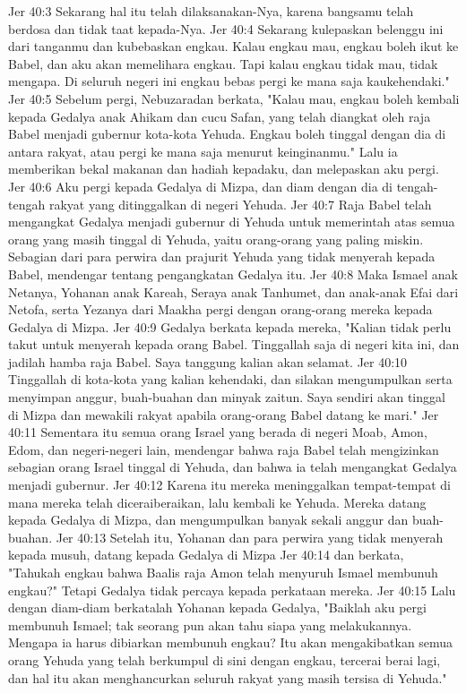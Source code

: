 Jer 40:3  Sekarang hal itu telah dilaksanakan-Nya, karena bangsamu telah berdosa dan tidak taat kepada-Nya.
Jer 40:4  Sekarang kulepaskan belenggu ini dari tanganmu dan kubebaskan engkau. Kalau engkau mau, engkau boleh ikut ke Babel, dan aku akan memelihara engkau. Tapi kalau engkau tidak mau, tidak mengapa. Di seluruh negeri ini engkau bebas pergi ke mana saja kaukehendaki."
Jer 40:5  Sebelum pergi, Nebuzaradan berkata, "Kalau mau, engkau boleh kembali kepada Gedalya anak Ahikam dan cucu Safan, yang telah diangkat oleh raja Babel menjadi gubernur kota-kota Yehuda. Engkau boleh tinggal dengan dia di antara rakyat, atau pergi ke mana saja menurut keinginanmu." Lalu ia memberikan bekal makanan dan hadiah kepadaku, dan melepaskan aku pergi.
Jer 40:6  Aku pergi kepada Gedalya di Mizpa, dan diam dengan dia di tengah-tengah rakyat yang ditinggalkan di negeri Yehuda.
Jer 40:7  Raja Babel telah mengangkat Gedalya menjadi gubernur di Yehuda untuk memerintah atas semua orang yang masih tinggal di Yehuda, yaitu orang-orang yang paling miskin. Sebagian dari para perwira dan prajurit Yehuda yang tidak menyerah kepada Babel, mendengar tentang pengangkatan Gedalya itu.
Jer 40:8  Maka Ismael anak Netanya, Yohanan anak Kareah, Seraya anak Tanhumet, dan anak-anak Efai dari Netofa, serta Yezanya dari Maakha pergi dengan orang-orang mereka kepada Gedalya di Mizpa.
Jer 40:9  Gedalya berkata kepada mereka, "Kalian tidak perlu takut untuk menyerah kepada orang Babel. Tinggallah saja di negeri kita ini, dan jadilah hamba raja Babel. Saya tanggung kalian akan selamat.
Jer 40:10  Tinggallah di kota-kota yang kalian kehendaki, dan silakan mengumpulkan serta menyimpan anggur, buah-buahan dan minyak zaitun. Saya sendiri akan tinggal di Mizpa dan mewakili rakyat apabila orang-orang Babel datang ke mari."
Jer 40:11  Sementara itu semua orang Israel yang berada di negeri Moab, Amon, Edom, dan negeri-negeri lain, mendengar bahwa raja Babel telah mengizinkan sebagian orang Israel tinggal di Yehuda, dan bahwa ia telah mengangkat Gedalya menjadi gubernur.
Jer 40:12  Karena itu mereka meninggalkan tempat-tempat di mana mereka telah diceraiberaikan, lalu kembali ke Yehuda. Mereka datang kepada Gedalya di Mizpa, dan mengumpulkan banyak sekali anggur dan buah-buahan.
Jer 40:13  Setelah itu, Yohanan dan para perwira yang tidak menyerah kepada musuh, datang kepada Gedalya di Mizpa
Jer 40:14  dan berkata, "Tahukah engkau bahwa Baalis raja Amon telah menyuruh Ismael membunuh engkau?" Tetapi Gedalya tidak percaya kepada perkataan mereka.
Jer 40:15  Lalu dengan diam-diam berkatalah Yohanan kepada Gedalya, "Baiklah aku pergi membunuh Ismael; tak seorang pun akan tahu siapa yang melakukannya. Mengapa ia harus dibiarkan membunuh engkau? Itu akan mengakibatkan semua orang Yehuda yang telah berkumpul di sini dengan engkau, tercerai berai lagi, dan hal itu akan menghancurkan seluruh rakyat yang masih tersisa di Yehuda."
